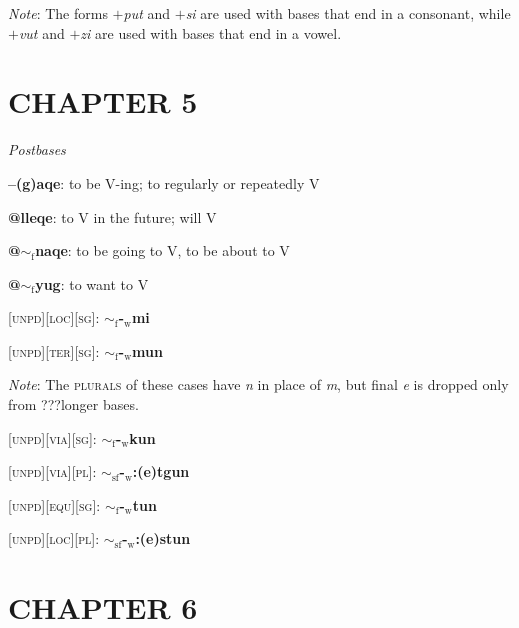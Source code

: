 \documentclass{article}
\begin{document}
\textit{Note}: The forms \textit{$+$put} and \textit{$+$si} are used with bases that end in a consonant, while \textit{$+$vut} and \textit{$+$zi} are used with bases that end in a vowel.

\section*{CHAPTER 5}

\textit{Postbases}
\begin{description}
\item \textbf{--(g)aqe}: to be V-ing; to regularly or repeatedly V
\item \textbf{@lleqe}: to V in the future; will V
\item \textbf{@$\sim_\text{f}$naqe}: to be going to V, to be about to V
\item \textbf{@$\sim_\text{f}$yug}: to want to V
\end{description}

\bigskip

\textsc{[unpd][loc][sg]}: \textbf{$\sim_\text{f}$-$_\text{w}$mi}

\textsc{[unpd][ter][sg]}: \textbf{$\sim_\text{f}$-$_\text{w}$mun}

\textit{Note}: The \textsc{plurals} of these cases have \textit{n} in place of \textit{m}, but final \textit{e} is dropped only from ???longer bases.

\bigskip

\textsc{[unpd][via][sg]}: \textbf{$\sim_\text{f}$-$_\text{w}$kun}

\textsc{[unpd][via][pl]}: \textbf{$\sim_\text{sf}$-$_\text{w}$:(e)tgun}

\textsc{[unpd][equ][sg]}: \textbf{$\sim_\text{f}$-$_\text{w}$tun}

\textsc{[unpd][loc][pl]}: \textbf{$\sim_\text{sf}$-$_\text{w}$:(e)stun}

\section{CHAPTER 6}
\end{document}
